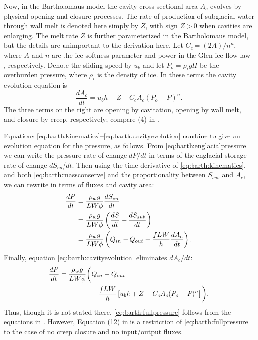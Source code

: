 \documentclass[twocolumn]{igs}
\begin{document}
Now, in the Bartholomaus model the cavity cross-sectional area $A_c$ evolves by physical opening and closure processes.  The rate of production of subglacial water through wall melt is denoted here simply by $Z$, with sign $Z>0$ when cavities are enlarging.  The melt rate $Z$ is further parameterized in the Bartholomaus model, but the details are unimportant to the derivation here.  Let $C_c = (2 A)/n^n$, where $A$ and $n$ are the ice softness parameter and power in the Glen ice flow law \citep{Glen}, respectively.  Denote the sliding speed by $u_b$ and let $P_o=\rho_i g H$ be the overburden pressure, where $\rho_i$ is the density of ice.  In these terms the cavity evolution equation is
\begin{equation}
\frac{dA_c}{dt} = u_b h + Z - C_c A_c (P_o-P)^n.  \label{eq:barth:cavityevolution}
\end{equation}
The three terms on the right are opening by cavitation, opening by wall melt, and closure by creep, respectively; compare (4) in \cite{Bartholomausetal2011}.

Equations \eqref{eq:barth:kinematics}--\eqref{eq:barth:cavityevolution} combine to give an evolution equation for the pressure, as follows.  From \eqref{eq:barth:englacialpressure} we can write the pressure rate of change $dP/dt$ in terms of the englacial storage rate of change $d S_{en}/dt$.  Then using the time-derivative of \eqref{eq:barth:kinematics}, and both \eqref{eq:barth:massconserve} and the proportionality between $S_{sub}$ and $A_c$, we can rewrite in terms of fluxes and cavity area:
\begin{align}
\frac{dP}{dt} &= \frac{\rho_w g}{L W \phi} \frac{d S_{en}}{dt} \\
&= \frac{\rho_w g}{L W \phi} \left(\frac{d S}{dt} - \frac{d S_{sub}}{dt}\right) \notag \\
&= \frac{\rho_w g}{L W \phi} \left(Q_{in} - Q_{out} - \frac{f L W}{h} \frac{d A_c}{dt}\right). \notag
\end{align}
Finally, equation \eqref{eq:barth:cavityevolution} eliminates $dA_c/dt$:
\begin{align}
&\frac{dP}{dt} = \frac{\rho_w g}{L W \phi} \bigg(Q_{in} - Q_{out} \label{eq:barth:fullpressure} \\
&\qquad \qquad \qquad - \frac{f L W}{h} \left[u_b h + Z - C_c A_c (P_o-P)^n\right]\bigg). \notag
\end{align}
Thus, though it is not stated there, \eqref{eq:barth:fullpressure} follows from the equations in \cite{Bartholomausetal2011}.  However, Equation (12) in \cite{Bartholomausetal2011} is a restriction of \eqref{eq:barth:fullpressure} to the case of no creep closure and no input/output fluxes.
\end{document}
